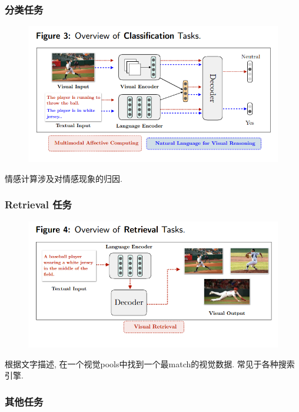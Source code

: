 \documentclass{article}
\begin{document}
\subsubsection{分类任务}

\begin{figure}[htbp]
    \centering
    \includegraphics[width=\textwidth]{vl-class.png}
\end{figure}

情感计算涉及对情感现象的归因.

\subsubsection{Retrieval 任务}

\begin{figure}[htbp]
    \centering
    \includegraphics[width=\textwidth]{vl-retrieval.png}
\end{figure}

根据文字描述, 在一个视觉pools中找到一个最match的视觉数据. 常见于各种搜索引擎.

\subsubsection{其他任务}
\end{document}
